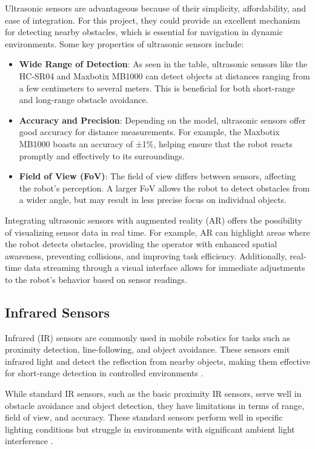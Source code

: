 Ultrasonic sensors are advantageous because of their simplicity, affordability, and ease of integration. For this project, they could provide an excellent mechanism for detecting nearby obstacles, which is essential for navigation in dynamic environments. Some key properties of ultrasonic sensors include:

\begin{itemize}
    \item \textbf{Wide Range of Detection}: As seen in the table, ultrasonic sensors like the HC-SR04 and Maxbotix MB1000 can detect objects at distances ranging from a few centimeters to several meters. This is beneficial for both short-range and long-range obstacle avoidance.
    \item \textbf{Accuracy and Precision}: Depending on the model, ultrasonic sensors offer good accuracy for distance measurements. For example, the Maxbotix MB1000 boasts an accuracy of ±1\%, helping ensure that the robot reacts promptly and effectively to its surroundings.
    \item \textbf{Field of View (FoV)}: The field of view differs between sensors, affecting the robot's perception. A larger FoV allows the robot to detect obstacles from a wider angle, but may result in less precise focus on individual objects.
\end{itemize}

Integrating ultrasonic sensors with augmented reality (AR) offers the possibility of visualizing sensor data in real time. For example, AR can highlight areas where the robot detects obstacles, providing the operator with enhanced spatial awareness, preventing collisions, and improving task efficiency. Additionally, real-time data streaming through a visual interface allows for immediate adjustments to the robot's behavior based on sensor readings.

\subsection{Infrared Sensors} 

Infrared (IR) sensors are commonly used in mobile robotics for tasks such as proximity detection, line-following, and object avoidance. These sensors emit infrared light and detect the reflection from nearby objects, making them effective for short-range detection in controlled environments \cite{benet2002infrared}.

While standard IR sensors, such as the basic proximity IR sensors, serve well in obstacle avoidance and object detection, they have limitations in terms of range, field of view, and accuracy. These standard sensors perform well in specific lighting conditions but struggle in environments with significant ambient light interference \cite{rhydo2024}.


